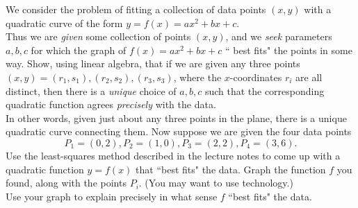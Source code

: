 \ii We consider the problem of fitting a collection of data points $(x,y)$ with a quadratic curve of the form $y=f(x)=ax^2+bx+c$. 
\\
Thus we are {\em given} some collection of points $(x,y)$, and we {\em seek} parameters $a, b, c$ for which the graph of $f(x)=ax^2+bx+c$ `` best fits" the points in some way. 
\bb
\ii Show, using linear algebra, that if we are given any three points $(x,y)=(r_1,s_1), (r_2,s_2), (r_3,s_3)$, where the $x$-coordinates $r_i$ are all distinct, then there is a {\em unique} choice of $a,b,c$ such that the corresponding quadratic function agrees {\em precisely} with the data. 
\\
In other words, given just about any three points in the plane, there is a unique quadratic curve connecting them. 
\ii Now suppose we are given the four data points 
\[
P_1=(0,2), P_2=(1,0), P_3=(2,2), P_4=(3,6).
\]
\bb
\ii Use the least-squares method described in the lecture notes to come up with a quadratic function $y=f(x)$ that ``best fits" the data. 
\ii Graph the function $f$ you found, along with the points $P_i$. (You may want to use technology.) 
\\
Use your graph to explain precisely in what sense $f$ ``best fits" the data. 
\ee
\ee
